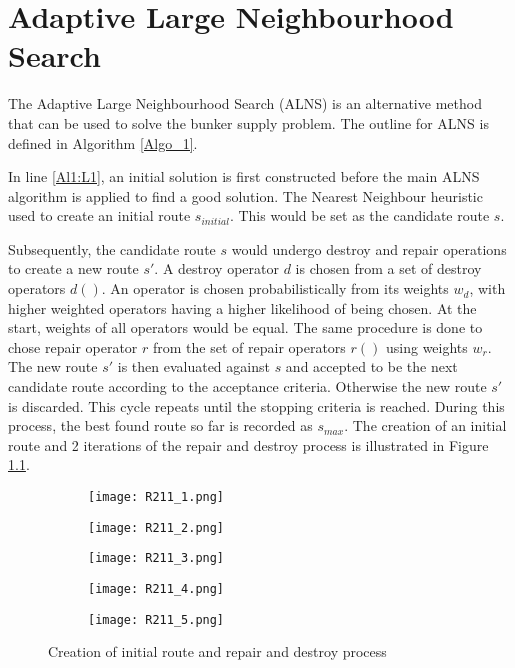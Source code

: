 \chapter{Adaptive Large Neighbourhood Search}

The Adaptive Large Neighbourhood Search (ALNS) is an alternative method that can be used to solve the bunker supply problem. The outline for ALNS is defined in Algorithm \ref{Algo_1}.

In line \ref{Al1:L1}, an initial solution is first constructed before the main ALNS algorithm is applied to find a good solution. The Nearest Neighbour heuristic used to create an initial route $s_{initial}$. This would be set as the candidate route $s$.

Subsequently, the candidate route $s$ would undergo destroy and repair operations to create a new route $s'$. A destroy operator $d$ is chosen from a set of destroy operators $d()$. An operator is chosen probabilistically from its weights $w_{d}$, with higher weighted operators having a higher likelihood of being chosen. At the start, weights of all operators would be equal. The same procedure is done to chose repair operator $r$ from the set of repair operators $r()$ using weights $w_{r}$. The new route $s'$ is then evaluated against $s$ and accepted to be the next candidate route according to the acceptance criteria. Otherwise the new route $s'$ is discarded. This cycle repeats until the stopping criteria is reached. During this process, the best found route so far is recorded as $s_{max}$. The creation of an initial route and 2 iterations of the repair and destroy process is illustrated in Figure \ref{Fig:Destroy_and_Repair}.

\begin{figure} 
\begin{subfigure}{\textwidth}
	\centering
	\texttt{[image: R211\_1.png]}
\end{subfigure}

\begin{subfigure}{.5\textwidth}
	\texttt{[image: R211\_2.png]}
\end{subfigure}
\begin{subfigure}{.5\textwidth}
	\texttt{[image: R211\_3.png]}
\end{subfigure}

\begin{subfigure}{.5\textwidth}
	\texttt{[image: R211\_4.png]}
\end{subfigure}
\begin{subfigure}{.5\textwidth}
	\texttt{[image: R211\_5.png]}
\end{subfigure}
\caption{Creation of initial route and repair and destroy process} \label{Fig:Destroy_and_Repair}
\end{figure} 

